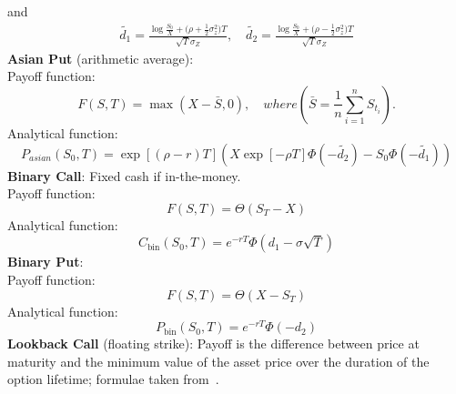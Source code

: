 \documentclass[11pt]{article}
\begin{document}
and
\begin{align}
    \tilde{d_1} = \frac{\log{\frac{S_0}{X}+ (\rho + \frac{1}{2}\sigma_z^2})T}{\sqrt{T}\sigma_Z}, \quad \tilde{d_2} = \frac{\log{\frac{S_0}{X}+ (\rho - \frac{1}{2}\sigma_z^2})T}{\sqrt{T}\sigma_Z}
\end{align}
\textbf{Asian Put} (arithmetic average):\\
Payoff function:
\begin{equation}
    F(S,T) = \max(X - \bar{S}, 0), \quad where (\bar{S} = \frac{1}{n}\sum_{i=1}^n S_{t_i}).
\end{equation}
Analytical function:
\begin{equation}
    P_{asian}(S_0,T) = \exp \left[ (\rho - r)T \right] (X \exp \left[ -\rho T \right] \Phi(-\tilde{d_2}) - S_0\Phi(-\tilde{d_1}))
\end{equation}
\textbf{Binary Call}: Fixed cash if in-the-money.\\
Payoff function:
\begin{equation}
    F(S,T) = \Theta(S_T - X)
\end{equation}
Analytical function:
\begin{equation}
    C_{\text{bin}}(S_0,T)=e^{-rT}\Phi(d_{1} - \sigma\sqrt{T})
\end{equation}
\textbf{Binary Put}:\\
Payoff function:
\begin{equation}
    F(S,T) = \Theta(X - S_T)
\end{equation}
Analytical function:
\begin{equation}
    P_{\text{bin}}(S_0,T)=e^{-rT}\Phi(-d_{2})
\end{equation}
\textbf{Lookback Call} (floating strike): Payoff is the difference between price at maturity and the minimum value of the asset price over the duration of the option lifetime; formulae taken from~\cite{quantstartLB}.
\end{document}
